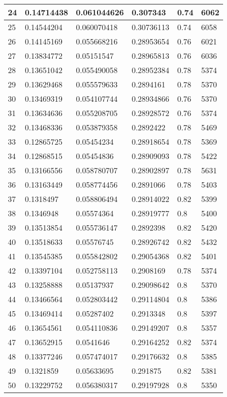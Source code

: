 \begin{longtable}{|l|l|l|l|l|l|}
24 & 0.14714438 & 0.061044626 & 0.307343 & 0.74 & 6062 \\ \hline 
25 & 0.14544204 & 0.060070418 & 0.30736113 & 0.74 & 6058 \\ \hline 
26 & 0.14145169 & 0.055668216 & 0.28953654 & 0.76 & 6021 \\ \hline 
27 & 0.13834772 & 0.05151547 & 0.28965813 & 0.76 & 6036 \\ \hline 
28 & 0.13651042 & 0.055490058 & 0.28952384 & 0.78 & 5374 \\ \hline 
29 & 0.13629468 & 0.055579633 & 0.2894161 & 0.78 & 5370 \\ \hline 
30 & 0.13469319 & 0.054107744 & 0.28934866 & 0.76 & 5370 \\ \hline 
31 & 0.13634636 & 0.055208705 & 0.28928572 & 0.76 & 5374 \\ \hline 
32 & 0.13468336 & 0.053879358 & 0.2892422 & 0.78 & 5469 \\ \hline 
33 & 0.12865725 & 0.05454234 & 0.28918654 & 0.78 & 5369 \\ \hline 
34 & 0.12868515 & 0.05454836 & 0.28909093 & 0.78 & 5422 \\ \hline 
35 & 0.13166556 & 0.058780707 & 0.28902897 & 0.78 & 5631 \\ \hline 
36 & 0.13163449 & 0.058774456 & 0.2891066 & 0.78 & 5403 \\ \hline 
37 & 0.1318497 & 0.058806494 & 0.28914022 & 0.82 & 5399 \\ \hline 
38 & 0.1346948 & 0.05574364 & 0.28919777 & 0.8 & 5400 \\ \hline 
39 & 0.13513854 & 0.055736147 & 0.2892398 & 0.82 & 5420 \\ \hline 
40 & 0.13518633 & 0.05576745 & 0.28926742 & 0.82 & 5432 \\ \hline 
41 & 0.13545385 & 0.055842802 & 0.29054368 & 0.82 & 5401 \\ \hline 
42 & 0.13397104 & 0.052758113 & 0.2908169 & 0.78 & 5374 \\ \hline 
43 & 0.13258888 & 0.05137937 & 0.29098642 & 0.8 & 5370 \\ \hline 
44 & 0.13466564 & 0.052803442 & 0.29114804 & 0.8 & 5386 \\ \hline 
45 & 0.13469414 & 0.05287402 & 0.2913348 & 0.8 & 5397 \\ \hline 
46 & 0.13654561 & 0.054110836 & 0.29149207 & 0.8 & 5357 \\ \hline 
47 & 0.13652915 & 0.0541646 & 0.29164252 & 0.82 & 5374 \\ \hline 
48 & 0.13377246 & 0.057474017 & 0.29176632 & 0.8 & 5385 \\ \hline 
49 & 0.1321859 & 0.05633695 & 0.291875 & 0.82 & 5381 \\ \hline 
50 & 0.13229752 & 0.056380317 & 0.29197928 & 0.8 & 5350 \\ \hline 
\end{longtable}